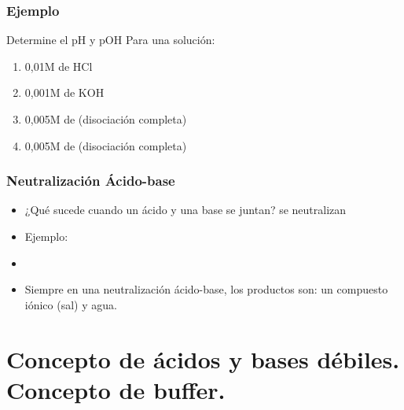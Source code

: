 \documentclass[11pt, aspectratio=169, xcolor=table]{beamer}
\begin{document}
\begin{frame}[allowdisplaybreaks]
	\frametitle{Ejemplo}
	\begin{exampleblock}{Determine el pH y pOH}
		Para una solución:
		\begin{enumerate}
			\item 0,01M de HCl
			\item 0,001M de KOH
			\item 0,005M de  (disociación completa)
			\item 0,005M de  (disociación completa)
		\end{enumerate}

	\end{exampleblock}
\end{frame}

\begin{frame}[allowdisplaybreaks]
	\frametitle{Neutralización Ácido-base}
	\begin{itemize}
		\item ¿Qué sucede cuando un ácido y una base se juntan? se neutralizan
		\item Ejemplo:
		\item {}
		\item Siempre en una neutralización ácido-base, los productos son: un compuesto iónico (sal) y agua.
	\end{itemize}

\end{frame}


\section{Concepto de ácidos y bases débiles. Concepto de buffer.}
\end{document}
